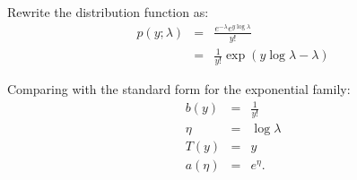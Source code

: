 \begin{answer}
	Rewrite the distribution function as:
	\begin{eqnarray*}
		p(y;\lambda) &=& \frac{ e^{-\lambda} e^{y \log \lambda}}{y!}\\
		&=& \frac{1}{y!} \exp(y \log \lambda - \lambda)
	\end{eqnarray*}
	
	Comparing with the standard form for the exponential family:
	\begin{eqnarray*}
		b(y) &=& \frac{1}{y!}\\
		\eta &=& \log \lambda\\
		T(y) &=& y\\
		a(\eta) &=& e^\eta.
	\end{eqnarray*}
\end{answer}
